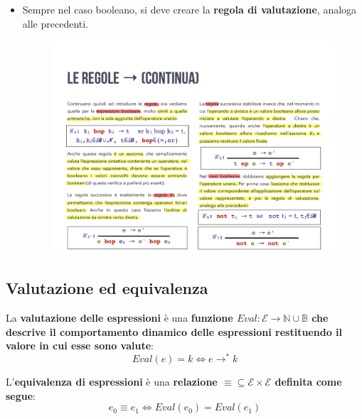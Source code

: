 \documentclass[a4paper]{article}
\begin{document}
\begin{itemize}
		\item Sempre nel caso booleano, si deve creare la \textbf{regola di valutazione}, analoga alle precedenti.
		\begin{figure}[!htp]
			\centering
			\includegraphics[width=.65\textwidth]{img/regola_transizione-7.pdf}
		\end{figure}
	\end{itemize}\newpage
	
	\subsection{Valutazione ed equivalenza}
	
	La \textcolor{Red3}{\textbf{valutazione delle espressioni}} è una \textbf{funzione $Eval: \mathcal{E} \rightarrow \mathbb{N} \cup \mathbb{B}$ che descrive il comportamento dinamico delle espressioni restituendo il valore in cui esse sono valute}:
	\begin{equation*}
		Eval\left(e\right) = k \iff e \rightarrow^* k
	\end{equation*}\:\newline

	\noindent
	L'\textcolor{Red3}{\textbf{equivalenza di espressioni}} è una \textbf{relazione $\equiv \subseteq \mathcal{E} \times \mathcal{E}$ definita come segue}:
	\begin{equation*}
		e_{0} \equiv e_{1} \iff Eval\left(e_{0}\right) = Eval\left(e_{1}\right)
	\end{equation*}
\end{document}
